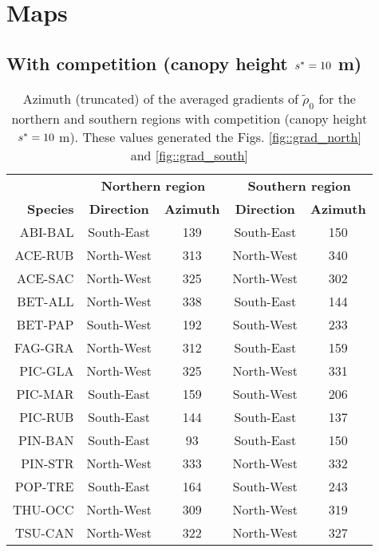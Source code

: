 \section{Maps} \label{app::maps}
\begin{refsection}
\subsection{With competition (canopy height $ {s}^{*} = 10 $ m)}
\begin{table}[ht]
\centering
\caption{Azimuth (truncated) of the averaged gradients of $ \tilde \rho_0 $ for the northern and southern regions with competition (canopy height $ {s}^{*} = 10 $ m). These values generated the Figs. \ref{fig::grad_north} and \ref{fig::grad_south} \label{tab::azimuth}}
\begin{tabular}{rcccc}
	\toprule
		~ & \multicolumn{2}{c}{\textbf{Northern region}} & \multicolumn{2}{c}{\textbf{Southern region}} \\
		\cmidrule(lr){2-3} \cmidrule(lr){4-5}
		\textbf{Species} & \textbf{Direction} & \textbf{Azimuth} & \textbf{Direction} & \textbf{Azimuth} \\
	\midrule
		ABI-BAL & South-East & 139 & South-East & 150 \\
		ACE-RUB & North-West & 313 & North-West & 340 \\
		ACE-SAC & North-West & 325 & North-West & 302 \\
		BET-ALL & North-West & 338 & South-East & 144 \\
		BET-PAP & South-West & 192 & South-West & 233 \\
		FAG-GRA & North-West & 312 & South-East & 159 \\
		PIC-GLA & North-West & 325 & North-West & 331 \\
		PIC-MAR & South-East & 159 & South-West & 206 \\
		PIC-RUB & South-East & 144 & South-East & 137 \\
		PIN-BAN & South-East & 93 & South-East & 150 \\
		PIN-STR & North-West & 333 & North-West & 332 \\
		POP-TRE & South-East & 164 & South-West & 243 \\
		THU-OCC & North-West & 309 & North-West & 319 \\
		TSU-CAN & North-West & 322 & North-West & 327 \\
	\bottomrule
\end{tabular}
\end{table}


\end{refsection}
